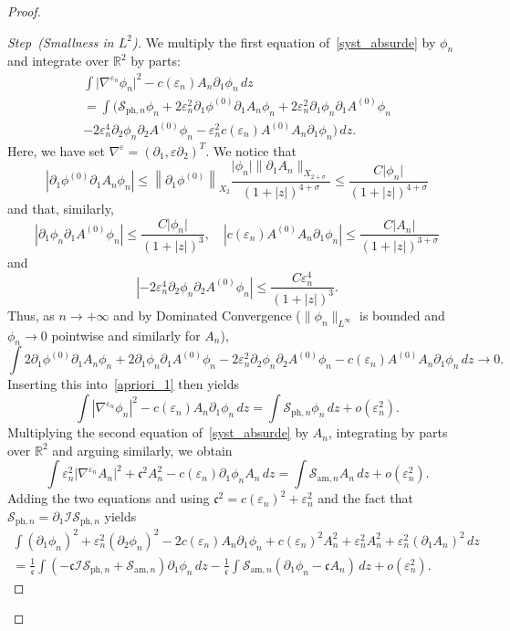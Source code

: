 \documentclass[AHL,Unicode,longabstracts,published]{cedram}
\newcommand*\p{\partial}
\newcommand*\R{\mathbb R}
\newcommand{\amm}{\mathrm{am}}
\newcommand{\phl}{\mathrm{ph}}
\newcommand*\BI{\mathcal{I}}
\newcommand*\BS{\mathcal{S}}
\newcommand*\cs{{\mathfrak c}}
\newcommand*\ii{\infty}
\newcommand*\ls{\leqslant }
\newcommand*\e{\varepsilon}
\newcommand*\s{\sigma}
\newcounter{stepcount}
\newenvironment{step}[1]{\refstepcounter{stepcount}\begin{proof}[{Step~\thestepcount}{\;(#1)}]}{\let\qed\relax\end{proof}}
\begin{document}
\begin{proof}
\begin{step}{{Smallness in $ L^2 $}}\label{step2sect4.4}
We multiply the first equation of~\eqref{syst_absurde} by $ \phi_n $ and integrate over $ \R^2 $ by parts:
\begin{multline}\label{apriori_1}
 \int \lvert \nabla^{\e_n} \phi_n \rvert^2 - c(\e_n) A_n \p_1 \phi_n \, dz\\
 = \int \Big(\BS_{{\phl},n} \phi_n + 2 \e_n^2 \p_1 \phi^{(0)} \p_1 A_n \phi_n + 2 \e_n^2 \p_1 \phi_n \p_1 A^{(0)} \phi_n
\\
- 2 \e_n^4 \p_{2} \phi_n \p_{2} A^{(0)} \phi_n - \e_n^2 c(\e_n) A^{(0)} A_n \p_1 \phi_n \Big) \, dz.
\end{multline}
Here, we have set $ \nabla^\e = (\p_1, \e \p_2)^T $. We notice that
\[
\left\lvert \p_1 \phi^{(0)} \p_1 A_n \phi_n \right\rvert
\ls \left\| \p_1 \phi^{(0)} \right\|_{X_2} \frac{ \lvert \phi_n \rvert \| \p_1 A_n \|_{X_{2+\s} }} { (1+|z|)^{4+\s} }
\ls \frac{ C \lvert \phi_n \rvert }{ (1+|z|)^{4+\s} }
\]
and that, similarly,
\[
\left\lvert \p_1 \phi_n \p_1 A^{(0)} \phi_n \right\rvert
\ls \frac{ C \lvert \phi_n \rvert }{ (1+|z|)^{3} },
\quad
\left\lvert c(\e_n) A^{(0)} A_n \p_1 \phi_n \right\rvert
\ls \frac{ C \lvert A_n \rvert }{ (1+|z|)^{3+ \s} }
\]
and
\[
\left\lvert - 2 \e_n^4 \p_{2} \phi_n \p_{2} A^{(0)} \phi_n \right\rvert \ls \frac{C \e_n^4}{ (1+ |z|)^3 }.
\]
Thus, as $ n \to +\ii $ and by Dominated Convergence ($\| \phi_n \|_{L^\ii} $ is bounded and $ \phi_n \to 0 $ pointwise and similarly for $A_n $),
\[
\int 2 \p_1 \phi^{(0)} \p_1 A_n \phi_n + 2 \p_1 \phi_n \p_1 A^{(0)} \phi_n - 2 \e_n^2 \p_{2} \phi_n \p_{2} A^{(0)} \phi_n - c(\e_n) A^{(0)} A_n \p_1 \phi_n \, dz
\to 0.
\]
Inserting this into~\eqref{apriori_1} then yields
\[
\int \left\lvert \nabla^{\e_n} \phi_n \right\rvert^2 - c(\e_n) A_n \p_1 \phi_n \, dz = \int \BS_{{\phl},n} \phi_n \, dz + o (\e_n^2).
\]
Multiplying the second equation of~\eqref{syst_absurde} by $ A_n $, integrating by parts over $ \R^2 $ and arguing similarly, we obtain
\[
\int \e_n^2 \lvert \nabla^{\e_n} A_n \rvert^2 + \cs^2 A_n^2 - c(\e_n) \p_1 \phi_n A_n \, dz = \int \BS_{{\amm},n} A_n \, dz + o (\e_n^2).
\]
Adding the two equations and using $ \cs^2 = c(\e_n)^2 + \e_n^2 $ and the fact that $ \BS_{{\phl},n} = \p_1 \BI \BS_{{\phl},n} $ yields
\begin{multline*}
 \int (\p_1 \phi_n)^2 + \e_n^2 (\p_2 \phi_n)^2 - 2 c(\e_n) A_n \p_1 \phi_n + c(\e_n)^2 A_n^2 + \e_n^2 A_n^2 + \e_n^2 (\p_1 A_n)^2
\, dz \\
 = \frac{1}{\cs} \int \left(- \cs \BI \BS_{{\phl},n} + \BS_{{\amm},n}\right) \p_1 \phi_n \, dz - \frac{1}{\cs} \int \BS_{{\amm},n} (\p_1 \phi_n - \cs A_n) \, dz + o(\e_n^2).

\end{multline*}
\end{step}
\end{proof}
\end{document}
